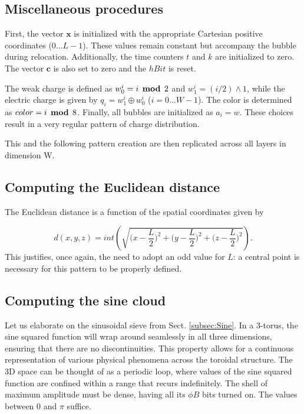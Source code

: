 \documentclass[12pt]{article}
\begin{document}
\subsection{Miscellaneous procedures}

First, the vector $\boldsymbol{x}$ is initialized with the appropriate Cartesian positive coordinates ($0 \dots L-1$). These values remain constant but accompany the bubble during relocation. Additionally, the time counters $t$ and $k$ are initialized to zero. The vector $\mathbf{c}$ is also set to zero and the $hBit$ is reset.
 
The weak charge is defined as $w_{0}^{i} = i \,\boldsymbol{\bmod}\, 2$ and $w_{1}^{i} = (i / 2) \land 1$, while the electric charge is given by $q_{i} = w_{1}^{i} \,\boldsymbol{\oplus}\, w_{0}^{i}$ ($i=0...W-1$). The color is determined as $color = i \,\boldsymbol{\bmod}\, 8$. Finally, all bubbles are initialized as $a_{i} = w$. These choices result in a very regular pattern of charge distribution.

This and the following pattern creation are then replicated across all layers in dimension W.

\subsection{Computing the Euclidean distance}
The Euclidean distance is a function of the spatial coordinates given by

\[
d(x,y,z)=int\left(\sqrt{\bigg(x-\frac{L}{2}\bigg)^{2}+\bigg(y-\frac{L}{2}\bigg)^{2}+\bigg(z-\frac{L}{2}\bigg)^{2}}\right).
\]
This justifies, once again, the need to adopt an odd value for $L$: a central point is necessary for this pattern to be properly defined. 

\subsection{Computing the sine cloud} \label{subsec:sine-cloud}
Let us elaborate on the sinusoidal sieve from Sect. \ref{subsec:Sine}. In a 3-torus, the sine squared function will wrap around seamlessly in all three dimensions, ensuring that there are no discontinuities. This property allows for a continuous representation of various physical phenomena across the toroidal structure. The 3D space can be thought of as a periodic loop, where values of the sine squared function are confined within a range that recurs indefinitely. The shell of maximum amplitude must be dense, having all its $\phi B$ bits turned on. The values between $0$ and $\pi$ suffice.
\end{document}
